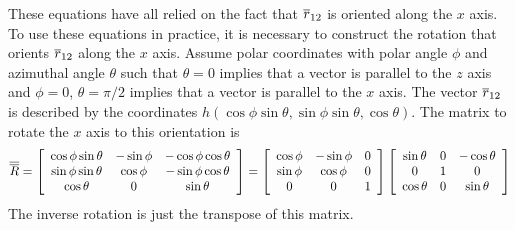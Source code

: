 \documentclass[12pt]{article}
\begin{document}
These equations have all relied on the fact that $\overline{r}_{12}$ is oriented along the
$x$ axis. To use these equations in practice, it is necessary to construct the rotation
that orients $\overline{r}_{12}$ along the $x$ axis. Assume polar coordinates with polar
angle $\phi$ and azimuthal angle $\theta$ such that $\theta = 0$ implies that a vector
is parallel to the $z$ axis and $\phi = 0$, $\theta = \pi/2$ implies that a vector is
parallel to the $x$ axis. The vector $\overline{r}_{12}$ is described by the coordinates
$h(\cos\phi\sin\theta,\sin\phi\sin\theta,\cos\theta)$. The matrix to rotate the $x$ axis
to this orientation is
\[
\overline{\overline{R}}=\left[\begin{array}{ccc}
\cos\phi\sin\theta & -\sin\phi & -\cos\phi\cos\theta \\
\sin\phi\sin\theta & \cos\phi & -\sin\phi\cos\theta \\
\cos\theta & 0 & \sin\theta
\end{array}\right]
=\left[\begin{array}{ccc}
\cos\phi & -\sin\phi & 0 \\
\sin\phi & \cos\phi & 0 \\
0 & 0 & 1\end{array}\right]
\left[\begin{array}{ccc}
\sin\theta & 0 & -\cos\theta \\
0 & 1 & 0 \\
\cos\theta & 0 & \sin\theta
\end{array}\right]
\]
The inverse rotation is just the transpose of this matrix.
\end{document}
